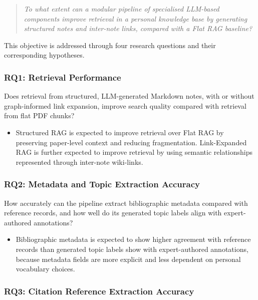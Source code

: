 \documentclass[runningheads]{llncs}
\begin{document}
\begin{quote}
\textit{To what extent can a modular pipeline of specialised LLM-based
components improve retrieval in a personal knowledge base by generating
structured notes and inter-note links, compared with a Flat RAG
baseline?}
\end{quote}

This objective is addressed through four research questions and their
corresponding hypotheses.

\subsubsection{RQ1: Retrieval Performance}

Does retrieval from structured, LLM-generated Markdown notes, with or
without graph-informed link expansion, improve search quality compared
with retrieval from flat PDF chunks?

\begin{itemize}
\item[\textbf{H1:}] Structured RAG is expected to improve retrieval over
Flat RAG by preserving paper-level context and reducing fragmentation.
Link-Expanded RAG is further expected to improve retrieval by using
semantic relationships represented through inter-note wiki-links.
\end{itemize}

\subsubsection{RQ2: Metadata and Topic Extraction Accuracy}

How accurately can the pipeline extract bibliographic metadata compared
with reference records, and how well do its generated topic labels align
with expert-authored annotations?

\begin{itemize}
\item[\textbf{H2:}] Bibliographic metadata is expected to show higher
agreement with reference records than generated topic labels show with
expert-authored annotations, because metadata fields are more explicit
and less dependent on personal vocabulary choices.
\end{itemize}

\subsubsection{RQ3: Citation Reference Extraction Accuracy}
\end{document}

